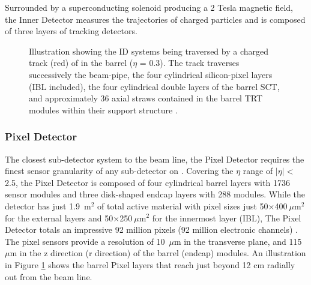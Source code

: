 Surrounded by a superconducting solenoid producing a 2 Tesla magnetic field, the Inner Detector measures the trajectories of charged particles and is composed of three layers of tracking detectors.
\begin{figure}[h]
  \begin{center}
  \end{center}
  \caption[Illustration showing the ID systems being traversed by a charged track (red) of \GeV in the barrel ($\eta$ = 0.3).]
          {Illustration showing the ID systems being traversed by a charged track (red) of \GeV in the barrel ($\eta$ = 0.3).
          The track traverses successively the beam-pipe, the four cylindrical silicon-pixel layers (IBL included), the four cylindrical double layers of the barrel SCT, and approximately 36 axial straws contained in the barrel TRT modules within their support structure \cite{PERF-2015-08}.}
  \label{fig:detector:innerdetector}
\end{figure}

\subsubsection{Pixel Detector} \label{sec:pixel}
The closest sub-detector system to the beam line, the Pixel Detector requires the finest sensor granularity of any sub-detector on \atlas.  
Covering the $\eta$ range of $|\eta|<$2.5, the Pixel Detector is composed of four cylindrical barrel layers with 1736 sensor modules and three disk-shaped endcap layers with 288 modules.
While the detector has just 1.9~$\text{m}^2$ of total active material with pixel sizes just 50$\times$400$~\mu\text{m}^2$ for the external layers and 50$\times$250$~\mu\text{m}^2$ for the innermost layer (IBL), The Pixel Detector totals an impressive 92 million pixels (92 million electronic channels) \cite{PERF-2007-01}. 
The pixel sensors provide a resolution of 10~$\mu$m in the transverse plane, and 115~$\mu$m in the z direction (r direction) of the barrel (endcap) modules.
An illustration in Figure \ref{fig:detector:innerdetector} shows the barrel Pixel layers that reach just beyond 12 cm radially out from the beam line.

